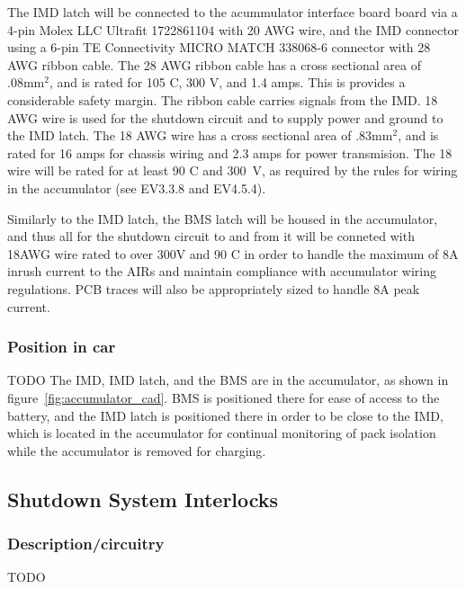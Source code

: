 \documentclass{article}
\begin{document}
The IMD latch will be connected to the acummulator interface board board via a 4-pin Molex LLC Ultrafit 1722861104 with 20 AWG wire, and the IMD connector using a  6-pin TE Connectivity MICRO MATCH 338068-6 connector with 28 AWG ribbon cable. The 28 AWG ribbon cable has a cross sectional area of .08mm$^2$, and is rated for 105 \textdegree C, 300 V, and 1.4 amps. This is provides a considerable safety margin. The ribbon cable carries signals from the IMD. 18 AWG wire is used for the shutdown circuit and to supply power and ground to the IMD latch. The 18 AWG wire has a cross sectional area of .83mm$^2$, and is rated for 16 amps for chassis wiring and 2.3 amps for power transmision. The 18 wire will be rated for at least 90 \textdegree C and 300~V, as required by the rules for wiring in the accumulator (see EV3.3.8 and EV4.5.4).

Similarly to the IMD latch, the BMS latch will be housed in the accumulator, and thus all for the shutdown circuit to and from it will be conneted with 18AWG wire rated to over 300V and 90 \textdegree C in order to handle the maximum of 8A inrush current to the AIRs and maintain compliance with accumulator wiring regulations. PCB traces will also be appropriately sized to handle 8A peak current. 


\subsubsection{Position in car}
TODO
The IMD, IMD latch, and the BMS are in the accumulator, as shown in figure~\ref{fig:accumulator_cad}. BMS is positioned there for ease of access to the battery, and the IMD latch is positioned there in order to be close to the IMD, which is located in the accumulator for continual monitoring of pack isolation while the accumulator is removed for charging. 

\subsection{Shutdown System Interlocks}\label{shutdown_system_interlocks}
\subsubsection{Description/circuitry}
TODO
\end{document}
